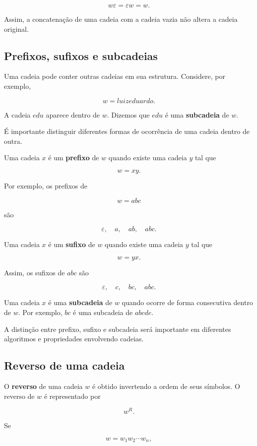 \documentclass[
  brazilian,
  letterpaper,
]{book}
\theoremstyle{plain}
\theoremstyle{definition}
\theoremstyle{remark}
\begin{document}
\[
w\varepsilon=\varepsilon w=w.
\]

Assim, a concatenação de uma cadeia com a cadeia vazia não altera a
cadeia original.

\subsection{Prefixos, sufixos e
subcadeias}\label{prefixos-sufixos-e-subcadeias}

Uma cadeia pode conter outras cadeias em sua estrutura. Considere, por
exemplo,

\[
w=luizeduardo.
\]

A cadeia \(edu\) aparece dentro de \(w\). Dizemos que \(edu\) é uma
\textbf{subcadeia} de \(w\).

É importante distinguir diferentes formas de ocorrência de uma cadeia
dentro de outra.

Uma cadeia \(x\) é um \textbf{prefixo} de \(w\) quando existe uma cadeia
\(y\) tal que

\[
w=xy.
\]

Por exemplo, os prefixos de

\[
w=abc
\]

são

\[
\varepsilon,\quad a,\quad ab,\quad abc.
\]

Uma cadeia \(x\) é um \textbf{sufixo} de \(w\) quando existe uma cadeia
\(y\) tal que

\[
w=yx.
\]

Assim, os sufixos de \(abc\) são

\[
\varepsilon,\quad c,\quad bc,\quad abc.
\]

Uma cadeia \(x\) é uma \textbf{subcadeia} de \(w\) quando ocorre de
forma consecutiva dentro de \(w\). Por exemplo, \(bc\) é uma subcadeia
de \(abcde\).

A distinção entre prefixo, sufixo e subcadeia será importante em
diferentes algoritmos e propriedades envolvendo cadeias.

\subsection{Reverso de uma cadeia}\label{reverso-de-uma-cadeia}

O \textbf{reverso} de uma cadeia \(w\) é obtido invertendo a ordem de
seus símbolos. O reverso de \(w\) é representado por

\[
w^R.
\]

Se

\[
w=w_1w_2\cdots w_n,
\]
\end{document}
